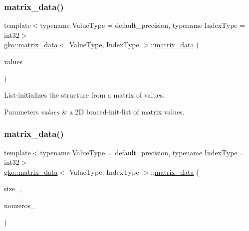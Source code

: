 \subsubsection{\texorpdfstring{matrix\+\_\+data()}{matrix\_data()}\hspace{0.1cm}{\footnotesize\ttfamily [3/6]}}
{\footnotesize\ttfamily template$<$typename Value\+Type = default\+\_\+precision, typename Index\+Type = int32$>$ \\
\hyperlink{structgko_1_1matrix__data}{gko\+::matrix\+\_\+data}$<$ Value\+Type, Index\+Type $>$\+::\hyperlink{structgko_1_1matrix__data}{matrix\+\_\+data} (\begin{DoxyParamCaption}\item[{std\+::initializer\+\_\+list$<$ std\+::initializer\+\_\+list$<$ Value\+Type $>$$>$}]{values }\end{DoxyParamCaption})}



List-\/initializes the structure from a matrix of values. 


\begin{DoxyParams}{Parameters}
{\em values} & a 2D braced-\/init-\/list of matrix values. \\
\hline
\end{DoxyParams}
\mbox{\label{structgko_1_1matrix__data_a80074a1ab496f2332b126407de533e76}} 
\subsubsection{\texorpdfstring{matrix\+\_\+data()}{matrix\_data()}\hspace{0.1cm}{\footnotesize\ttfamily [4/6]}}
{\footnotesize\ttfamily template$<$typename Value\+Type = default\+\_\+precision, typename Index\+Type = int32$>$ \\
\hyperlink{structgko_1_1matrix__data}{gko\+::matrix\+\_\+data}$<$ Value\+Type, Index\+Type $>$\+::\hyperlink{structgko_1_1matrix__data}{matrix\+\_\+data} (\begin{DoxyParamCaption}\item[{\hyperlink{structgko_1_1dim}{dim}$<$ 2 $>$}]{size\+\_\+,  }\item[{std\+::initializer\+\_\+list$<$ detail\+::input\+\_\+triple$<$ Value\+Type, Index\+Type $>$$>$}]{nonzeros\+\_\+ }\end{DoxyParamCaption})}



